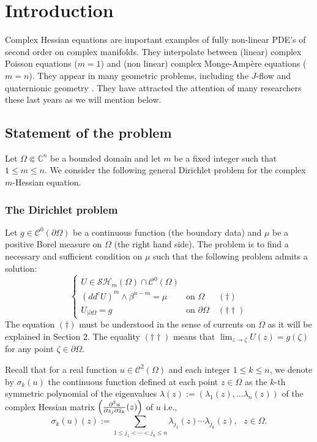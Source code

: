 \documentclass[11pt]{article}
\newcommand{\ie}{i.e.,\xspace}
\providecommand{\C}{}
\numberwithin{equation}{section}
\theoremstyle{definition}
\renewcommand{\C}{\mathbb{C}}
\newcommand{\Cc}{\mathcal{C}}
\theoremstyle{plain}
\theoremstyle{definition}
\begin{document}
\section{Introduction}\label{sec:1}

Complex Hessian equations are important examples of fully non-linear PDE's of second order on complex manifolds. They interpolate between (linear) complex \hbox{Poisson} equations ($m = 1$) and (non linear) complex Monge-Ampère equations \hbox{($m=n$)}.
They appear in many geometric problems, including the $J$-flow
\cite{SW} and quaternionic geometry \cite{AV}. They have attracted the attention of many researchers these last years as we will mention below.

\subsection{Statement of the problem}

Let $\Omega \Subset \C^n$ be a bounded domain and let $m$ be a fixed integer such that $1 \leq m \leq n$.
We consider the following general Dirichlet problem for the complex $m$-Hessian equation.

\subsubsection*{The Dirichlet problem} Let $g \in \Cc^{0} (\partial \Omega)$ be a continuous function (the boundary data) and $\mu$ be a positive Borel measure on $\Omega$ (the right hand side). The problem is to find a necessary and sufficient condition on $\mu$ such that the following problem admits a solution:
\begin{equation}\label{eq:DirPb}
\begin{cases}
U \in \mathcal{SH}_m (\Omega) \cap \mathcal {C}^{0} ({\Omega}) \\
(dd^c U)^m \wedge \beta^{n - m} = \mu &\text{on } \Omega\;\;\quad(\dag)\\
U_{\mid \partial \Omega} = g & \text{on } \partial \Omega\quad(\dag \dag)
\end{cases}
\end{equation}
The equation $(\dag)$ must be understood in the sense of currents on $\Omega$ as it will be explained in Section $2$.
The equality $(\dag \dag)$ means that $\lim_{z \to \zeta} U (z) = g (\zeta)$ for any point $\zeta \in \partial \Omega$.

Recall that for a real function $u \in \Cc^2 (\Omega)$ and each integer $1 \leq k \leq n$, we denote by $\sigma_k (u)$ the continuous function defined at each point $z \in \Omega$ as the $k$-th symmetric polynomial of the eigenvalues $\lambda (z):= (\lambda_1 (z),\dots \lambda_n(z))$
of the complex Hessian matrix $\Bigl(\frac{\partial^2 u }{\partial z_j \partial \bar{z}_k} (z)\Bigr)$ of $u$ \ie
\[
\sigma_k (u) (z):= \sum_{1 \leq j_1 < \cdots < j_k \leq n} \lambda_{j_1} (z) \cdots \lambda_{j_k} (z), \, \, \, \, z \in \Omega.
\]
\end{document}
